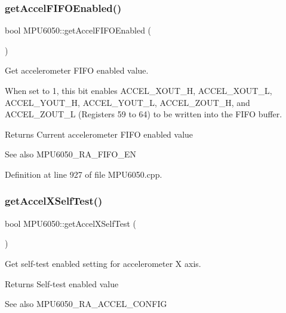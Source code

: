 \subsubsection{\texorpdfstring{getAccelFIFOEnabled()}{getAccelFIFOEnabled()}}
{\footnotesize\ttfamily bool M\+P\+U6050\+::get\+Accel\+F\+I\+F\+O\+Enabled (\begin{DoxyParamCaption}{ }\end{DoxyParamCaption})}



Get accelerometer F\+I\+FO enabled value. 

When set to 1, this bit enables A\+C\+C\+E\+L\+\_\+\+X\+O\+U\+T\+\_\+H, A\+C\+C\+E\+L\+\_\+\+X\+O\+U\+T\+\_\+L, A\+C\+C\+E\+L\+\_\+\+Y\+O\+U\+T\+\_\+H, A\+C\+C\+E\+L\+\_\+\+Y\+O\+U\+T\+\_\+L, A\+C\+C\+E\+L\+\_\+\+Z\+O\+U\+T\+\_\+H, and A\+C\+C\+E\+L\+\_\+\+Z\+O\+U\+T\+\_\+L (Registers 59 to 64) to be written into the F\+I\+FO buffer. \begin{DoxyReturn}{Returns}
Current accelerometer F\+I\+FO enabled value 
\end{DoxyReturn}
\begin{DoxySeeAlso}{See also}
M\+P\+U6050\+\_\+\+R\+A\+\_\+\+F\+I\+F\+O\+\_\+\+EN 
\end{DoxySeeAlso}


Definition at line 927 of file M\+P\+U6050.\+cpp.

\mbox{\label{classMPU6050_a8fc7eab1302281f6e4bc953379f3237b}} 
\subsubsection{\texorpdfstring{getAccelXSelfTest()}{getAccelXSelfTest()}}
{\footnotesize\ttfamily bool M\+P\+U6050\+::get\+Accel\+X\+Self\+Test (\begin{DoxyParamCaption}{ }\end{DoxyParamCaption})}



Get self-\/test enabled setting for accelerometer X axis. 

\begin{DoxyReturn}{Returns}
Self-\/test enabled value 
\end{DoxyReturn}
\begin{DoxySeeAlso}{See also}
M\+P\+U6050\+\_\+\+R\+A\+\_\+\+A\+C\+C\+E\+L\+\_\+\+C\+O\+N\+F\+IG 
\end{DoxySeeAlso}


